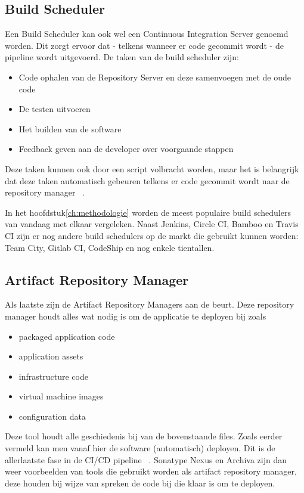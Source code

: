     \subsection{Build Scheduler}
    Een Build Scheduler kan ook wel een Continuous Integration Server genoemd worden.
    Dit zorgt ervoor dat - telkens wanneer er code gecommit wordt - de pipeline wordt uitgevoerd. De taken van de build scheduler zijn: 
    \begin{itemize}
        \item Code ophalen van de Repository Server en deze samenvoegen met de oude code
        \item De testen uitvoeren
        \item Het builden van de software
        \item Feedback geven aan de developer over voorgaande stappen
    \end{itemize}
    Deze taken kunnen ook door een script volbracht worden, maar het is belangrijk dat deze taken automatisch gebeuren telkens er code gecommit wordt naar de repository manager ~\autocite{Riti2018}.

    In het hoofdstuk\ref{ch:methodologie} worden de meest populaire build schedulers van vandaag met elkaar vergeleken. Naast Jenkins, Circle CI, Bamboo en Travis CI zijn er nog andere build schedulers op de markt die gebruikt kunnen worden: Team City, Gitlab CI, CodeShip en nog enkele tientallen.
    
    
    \subsection{Artifact Repository Manager}
    Als laatste zijn de Artifact Repository Managers aan de beurt. Deze repository manager houdt alles wat nodig is om de applicatie te deployen bij zoals
    \begin{itemize}
        \item packaged application code
        \item application assets
        \item infrastructure code
        \item virtual machine images
        \item configuration data
    \end{itemize}
    Deze tool houdt alle geschiedenis bij van de bovenstaande files. Zoals eerder vermeld kan men vanaf hier de software (automatisch) deployen. Dit is de allerlaatste fase in de CI/CD pipeline ~\autocite{Skelton2014}.
    Sonatype Nexus en Archiva zijn dan weer voorbeelden van tools die gebruikt worden als artifact repository manager, deze houden bij wijze van spreken de code bij die klaar is om te deployen. 

